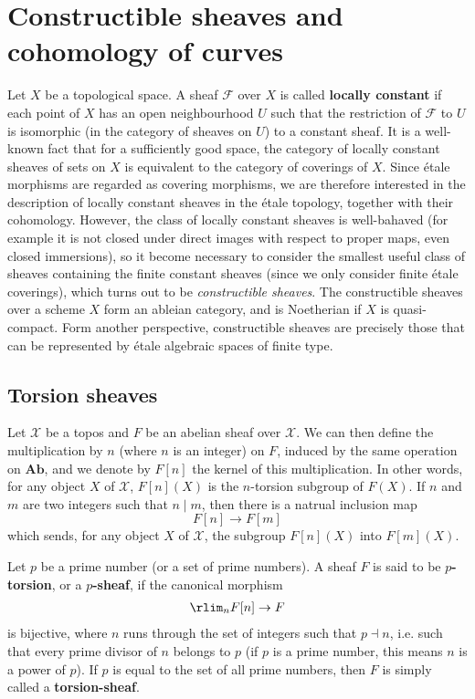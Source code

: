 \section{Constructible sheaves and cohomology of curves}
Let $X$ be a topological space. A sheaf $\mathscr{F}$ over $X$ is called \textbf{locally constant} if each point of $X$ has an open neighbourhood $U$ such that the restriction of $\mathscr{F}$ to $U$ is isomorphic (in the category of sheaves on $U$) to a constant sheaf. It is a well-known fact that for a sufficiently good space, the category of locally constant sheaves of sets on $X$ is equivalent to the category of coverings of $X$. Since \'etale morphisms are regarded as covering morphisms, we are therefore interested in the description of locally constant sheaves in the \'etale topology, together with their cohomology. However, the class of locally constant sheaves is well-bahaved (for example it is not closed under direct images with respect to proper maps, even closed immersions), so it become necessary to consider the smallest useful class of sheaves containing the finite constant sheaves (since we only consider finite \'etale coverings), which turns out to be \textit{constructible sheaves}. The constructible sheaves over a scheme $X$ form an ableian category, and is Noetherian if $X$ is quasi-compact. Form another perspective, constructible sheaves are precisely those that can be represented by \'etale algebraic spaces of finite type.
\subsection{Torsion sheaves}
Let $\mathcal{X}$ be a topos and $F$ be an abelian sheaf over $\mathcal{X}$. We can then define the multiplication by $n$ (where $n$ is an integer) on $F$, induced by the same operation on $\mathbf{Ab}$, and we denote by $F[n]$ the kernel of this multiplication. In other words, for any object $X$ of $\mathcal{X}$, $F[n](X)$ is the $n$-torsion subgroup of $F(X)$. If $n$ and $m$ are two integers such that $n\mid m$, then there is a natrual inclusion map
\[F[n]\to F[m]\]
which sends, for any object $X$ of $\mathcal{X}$, the subgroup $F[n](X)$ into $F[m](X)$.

\begin{definition}
Let $p$ be a prime number (or a set of prime numbers). A sheaf $F$ is said to be \textbf{$p$-torsion}, or a \textbf{$p$-sheaf}, if the canonical morphism
\begin{align}\label{topos torsion abelian sheaf def}
\rlim_nF[n]\to F
\end{align}
is bijective, where $n$ runs through the set of integers such that $p\dashv n$, i.e. such that every prime divisor of $n$ belongs to $p$ (if $p$ is a prime number, this means $n$ is a power of $p$). If $p$ is equal to the set of all prime numbers, then $F$ is simply called a \textbf{torsion-sheaf}.
\end{definition}

